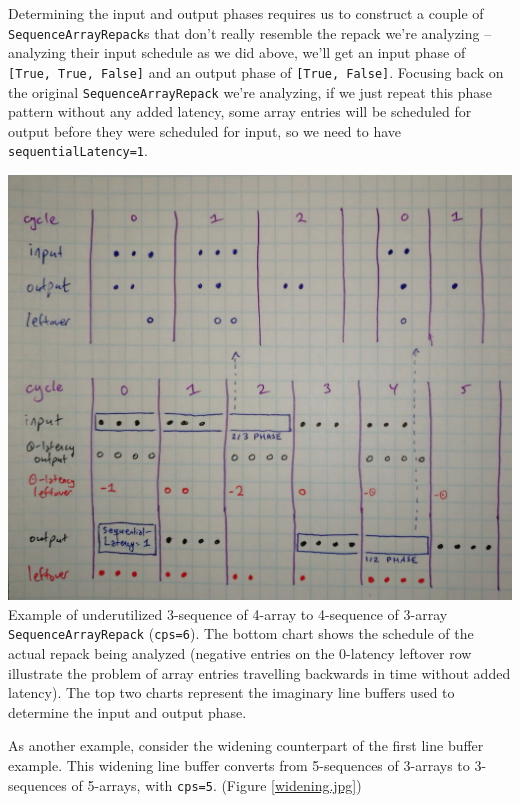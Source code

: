 \documentclass[12pt]{article}
\begin{document}
Determining the input and output phases requires us to construct a
couple of \texttt{SequenceArrayRepack}s that don't really resemble the
repack we're analyzing -- analyzing their input schedule as we did
above, we'll get an input phase of \texttt{[True, True, False]} and an
output phase of \texttt{[True, False]}. Focusing back on the original
\texttt{SequenceArrayRepack} we're analyzing, if we just repeat this
phase pattern without any added latency, some array entries will be
scheduled for output before they were scheduled for input, so we need
to have \texttt{sequentialLatency=1}.

\begin{center}
\includegraphics[width=1.0\linewidth]{Figures/underutil-repack.jpg}
Example of underutilized 3-sequence of 4-array to 4-sequence of
3-array \texttt{SequenceArrayRepack} (\texttt{cps=6}). The bottom
chart shows the schedule of the actual repack being analyzed (negative
entries on the 0-latency leftover row illustrate the problem of array
entries travelling backwards in time without added latency). The top
two charts represent the imaginary line buffers used to determine the
input and output phase.
\end{center}

\newpage
As another example, consider the widening counterpart of the first
line buffer example. This widening line buffer converts from
5-sequences of 3-arrays to 3-sequences of 5-arrays, with
\texttt{cps=5}. (Figure \ref{widening.jpg})
\end{document}
